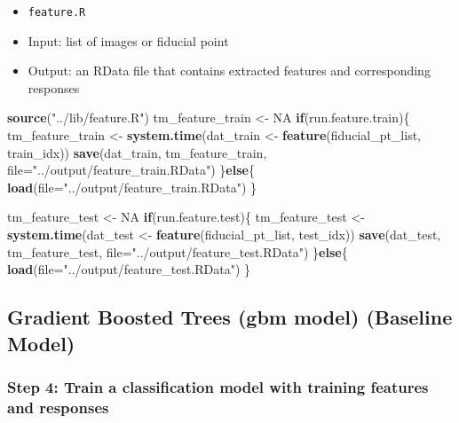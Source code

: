 \documentclass[
]{article}
\newenvironment{Shaded}{\begin{snugshade}}{\end{snugshade}}
\newcommand{\ControlFlowTok}[1]{\textcolor[rgb]{0.13,0.29,0.53}{\textbf{#1}}}
\newcommand{\DataTypeTok}[1]{\textcolor[rgb]{0.13,0.29,0.53}{#1}}
\newcommand{\KeywordTok}[1]{\textcolor[rgb]{0.13,0.29,0.53}{\textbf{#1}}}
\newcommand{\NormalTok}[1]{#1}
\newcommand{\OtherTok}[1]{\textcolor[rgb]{0.56,0.35,0.01}{#1}}
\newcommand{\StringTok}[1]{\textcolor[rgb]{0.31,0.60,0.02}{#1}}
\providecommand{\tightlist}{%
  \setlength{\itemsep}{0pt}\setlength{\parskip}{0pt}}
\begin{document}
\begin{itemize}
\tightlist
\item
  \texttt{feature.R}
\item
  Input: list of images or fiducial point
\item
  Output: an RData file that contains extracted features and
  corresponding responses
\end{itemize}

\begin{Shaded}
\begin{Highlighting}[]
\KeywordTok{source}\NormalTok{(}\StringTok{"../lib/feature.R"}\NormalTok{)}
\NormalTok{tm_feature_train <-}\StringTok{ }\OtherTok{NA}
\ControlFlowTok{if}\NormalTok{(run.feature.train)\{}
\NormalTok{  tm_feature_train <-}\StringTok{ }\KeywordTok{system.time}\NormalTok{(dat_train <-}\StringTok{ }\KeywordTok{feature}\NormalTok{(fiducial_pt_list, train_idx))}
  \KeywordTok{save}\NormalTok{(dat_train, tm_feature_train, }\DataTypeTok{file=}\StringTok{"../output/feature_train.RData"}\NormalTok{)}
\NormalTok{\}}\ControlFlowTok{else}\NormalTok{\{}
  \KeywordTok{load}\NormalTok{(}\DataTypeTok{file=}\StringTok{"../output/feature_train.RData"}\NormalTok{)}
\NormalTok{\}}

\NormalTok{tm_feature_test <-}\StringTok{ }\OtherTok{NA}
\ControlFlowTok{if}\NormalTok{(run.feature.test)\{}
\NormalTok{  tm_feature_test <-}\StringTok{ }\KeywordTok{system.time}\NormalTok{(dat_test <-}\StringTok{ }\KeywordTok{feature}\NormalTok{(fiducial_pt_list, test_idx))}
  \KeywordTok{save}\NormalTok{(dat_test, tm_feature_test, }\DataTypeTok{file=}\StringTok{"../output/feature_test.RData"}\NormalTok{)}
\NormalTok{\}}\ControlFlowTok{else}\NormalTok{\{}
  \KeywordTok{load}\NormalTok{(}\DataTypeTok{file=}\StringTok{"../output/feature_test.RData"}\NormalTok{)}
\NormalTok{\}}
\end{Highlighting}
\end{Shaded}

\newpage

\hypertarget{gradient-boosted-trees-gbm-model-baseline-model}{%
\subsection{Gradient Boosted Trees (gbm model) (Baseline
Model)}\label{gradient-boosted-trees-gbm-model-baseline-model}}

\hypertarget{step-4-train-a-classification-model-with-training-features-and-responses}{%
\subsubsection{Step 4: Train a classification model with training
features and
responses}\label{step-4-train-a-classification-model-with-training-features-and-responses}}
\end{document}

